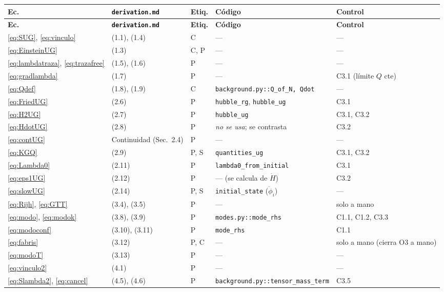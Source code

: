 \small
\begin{longtable}{@{}L{2.0cm}L{2.4cm}L{1.0cm}L{5.2cm}L{2.7cm}@{}}
\toprule
\textbf{Ec.} & \textbf{\texttt{derivation.md}} & \textbf{Etiq.} & \textbf{Código} & \textbf{Control}\\
\midrule
\endfirsthead
\toprule
\textbf{Ec.} & \textbf{\texttt{derivation.md}} & \textbf{Etiq.} & \textbf{Código} & \textbf{Control}\\
\midrule
\endhead
\bottomrule
\endfoot
\eqref{eq:SUG}, \eqref{eq:vinculo} & (1.1), (1.4) & C & --- & ---\\
\eqref{eq:EinsteinUG} & (1.3) & C, P & --- & ---\\
\eqref{eq:lambdatraza}, \eqref{eq:trazafree} & (1.5), (1.6) & P & --- & ---\\
\eqref{eq:gradlambda} & (1.7) & P & --- & C3.1 (límite $Q$ cte)\\
\eqref{eq:Qdef} & (1.8), (1.9) & C & \texttt{background.py::Q\_of\_N, Qdot} & ---\\
\eqref{eq:FriedUG} & (2.6) & P & \texttt{hubble\_rg}, \texttt{hubble\_ug} & C3.1\\
\eqref{eq:H2UG} & (2.7) & P & \texttt{hubble\_ug} & C3.1, C3.2\\
\eqref{eq:HdotUG} & (2.8) & P & \emph{no se usa}; se contrasta & C3.2\\
\eqref{eq:contUG} & Continuidad (Sec.~2.4) & P & --- & ---\\
\eqref{eq:KGQ} & (2.9) & P, S & \texttt{quantities\_ug} & C3.1, C3.2\\
\eqref{eq:Lambda0} & (2.11) & P & \texttt{lambda0\_from\_initial} & C3.1\\
\eqref{eq:eps1UG} & (2.12) & P & --- (se calcula de $\dot H$) & C3.2\\
\eqref{eq:slowUG} & (2.14) & P, S & \texttt{initial\_state} ($\dot\phi_i$) & ---\\
\eqref{eq:Rijh}, \eqref{eq:GTT} & (3.4), (3.5) & P & --- & solo a mano\\
\eqref{eq:modo}, \eqref{eq:modok} & (3.8), (3.9) & P & \texttt{modes.py::mode\_rhs} & C1.1, C1.2, C3.3\\
\eqref{eq:modoconf} & (3.10), (3.11) & P & \texttt{mode\_rhs} & C1.1\\
\eqref{eq:fabris} & (3.12) & P, C & --- & solo a mano (cierra O3 a mano)\\
\eqref{eq:modoT} & (3.13) & P & --- & ---\\
\eqref{eq:vinculo2} & (4.1) & P & --- & ---\\
\eqref{eq:Slambda2}, \eqref{eq:cancel} & (4.5), (4.6) & P & \texttt{background.py::tensor\_mass\_term} & C3.5\\

\end{longtable}
